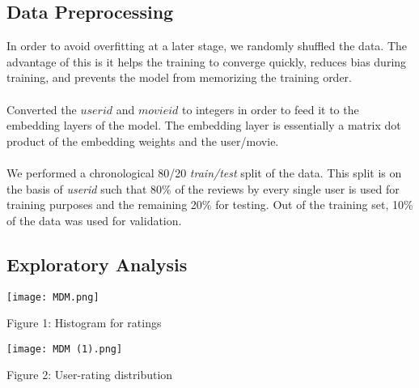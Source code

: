 \documentclass[sigconf]{acmart}
\begin{document}
\subsection{Data Preprocessing}
In order to avoid overfitting at a later stage, we randomly shuffled the data. The advantage of this is it helps the training to converge quickly, reduces bias during training, and prevents the model from memorizing the training order.\\\\
Converted the \emph{$userid$} and \emph{$movieid$} to integers in order to feed it to the embedding layers of the model. The embedding layer is essentially a matrix dot product of the embedding weights and the user/movie.\\\\
We performed a chronological 80/20 \emph{train/test} split of the data. This split is on the basis of \emph{userid} such that 80\% of the reviews by every single user is used for training purposes and the remaining 20\% for testing. Out of the training set, 10\% of the data was used for validation.

\subsection{Exploratory Analysis}
\texttt{[image: MDM.png]}
\begin{center}
    Figure 1: Histogram for ratings
\end{center}



\texttt{[image: MDM (1).png]}
\begin{center}
    Figure 2: User-rating distribution
\end{center}



\end{document}
